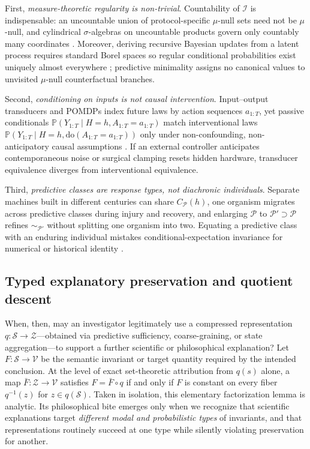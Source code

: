 \documentclass[11pt,a4paper]{article}
\begin{document}
First, \emph{measure-theoretic regularity is non-trivial}. Countability
of \(\mathcal{I}\) is indispensable: an uncountable union of
protocol-specific \(\mu\)-null sets need not be \(\mu\)-null, and
cylindrical \(\sigma\)-algebras on uncountable products govern only
countably many coordinates \citep{kallenberg2021}. Moreover, deriving
recursive Bayesian updates from a latent process requires standard Borel
spaces so regular conditional probabilities exist uniquely almost
everywhere \citep{astrom1965, kaelbling1998}; predictive minimality
assigns no canonical values to unvisited \(\mu\)-null counterfactual
branches.

Second, \emph{conditioning on inputs is not causal intervention}.
Input--output transducers \citep{barnettCrutchfield2015} and POMDPs
\citep{kaelbling1998} index future laws by action sequences \(a_{1:T}\),
yet passive conditionals
\(\mathbb{P}(Y_{1:T} \mid H = h, A_{1:T} = a_{1:T})\) match
interventional laws
\(\mathbb{P}(Y_{1:T} \mid H = h, \mathrm{do}(A_{1:T} = a_{1:T}))\) only
under non-confounding, non-anticipatory causal assumptions
\citep{pearl2009, woodward2003}. If an external controller anticipates
contemporaneous noise or surgical clamping resets hidden hardware,
transducer equivalence diverges from interventional equivalence.

Third, \emph{predictive classes are response types, not diachronic
individuals}. Separate machines built in different centuries can share
\(C_{\mathcal{P}}(h)\), one organism migrates across predictive classes
during injury and recovery, and enlarging \(\mathcal{P}\) to
\(\mathcal{P}' \supset \mathcal{P}\) refines \(\sim_{\mathcal{P}'}\)
without splitting one organism into two. Equating a predictive class
with an enduring individual mistakes conditional-expectation invariance
for numerical or historical identity \citep{wiggins2001}.

\subsection{Typed explanatory preservation and quotient
descent}\label{typed-explanatory-preservation-and-quotient-descent}

When, then, may an investigator legitimately use a compressed
representation \(q: \mathcal{S} \to \mathcal{Z}\)---obtained via
predictive sufficiency, coarse-graining, or state aggregation---to
support a further scientific or philosophical explanation? Let
\(F: \mathcal{S} \to \mathcal{V}\) be the semantic invariant or target
quantity required by the intended conclusion. At the level of exact
set-theoretic attribution from \(q(s)\) alone, a map
\(\bar{F}: \mathcal{Z} \to \mathcal{V}\) satisfies
\(F = \bar{F} \circ q\) if and only if \(F\) is constant on every fiber
\(q^{-1}(z)\) for \(z \in q(\mathcal{S})\). Taken in isolation, this
elementary factorization lemma is analytic. Its philosophical bite
emerges only when we recognize that scientific explanations target
\emph{different modal and probabilistic types} of invariants, and that
representations routinely succeed at one type while silently violating
preservation for another.
\end{document}
